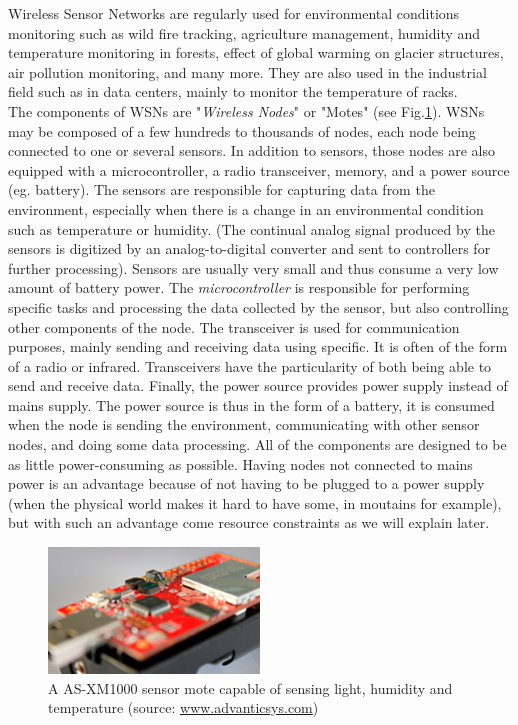 Wireless Sensor Networks are regularly used for environmental conditions monitoring such as wild fire tracking, agriculture management, humidity and temperature monitoring in forests, effect of global warming on glacier structures, air pollution monitoring, and many more. They are also used in the industrial field such as in data centers, mainly to monitor the temperature of racks.  \\

The components of WSNs are "\textit{Wireless Nodes}" or "Motes" (see Fig.\ref{fig:xm1000}). WSNs may be composed of a few hundreds to thousands of nodes, each node being connected to one or several sensors. In addition to sensors, those nodes are also equipped with a microcontroller, a radio transceiver, memory, and a power source (eg. battery). The sensors are responsible for capturing data from the environment, especially when there is a change in an environmental condition such as temperature or humidity. (The continual analog signal produced by the sensors is digitized by an analog-to-digital converter and sent to controllers for further processing). Sensors are usually very small and thus consume a very low amount of battery power. The \textit{microcontroller} is responsible for performing specific tasks and processing the data collected by the sensor, but also controlling other components of the node. The transceiver is used for communication purposes, mainly sending and receiving data using specific. It is often of the form of a radio or infrared. Transceivers have the particularity of both being able to send and receive data. Finally, the power source provides power supply instead of mains supply. The power source is thus in the form of a battery, it is consumed when the node is sending the environment, communicating with other sensor nodes, and doing some data processing. All of the components are designed to be as little power-consuming as possible. Having nodes not connected to mains power is an advantage because of not having to be plugged to a power supply (when the physical world makes it hard to have some, in moutains for example), but with such an advantage come resource constraints as we will explain later.\\

\begin{figure}
  \centering
  \includegraphics[width=0.5\textwidth]{res/xm1000.png}
  \caption{A AS-XM1000 sensor mote capable of sensing light, humidity and temperature (source: \url{www.advanticsys.com})}
  \label{fig:xm1000}
\end{figure}

